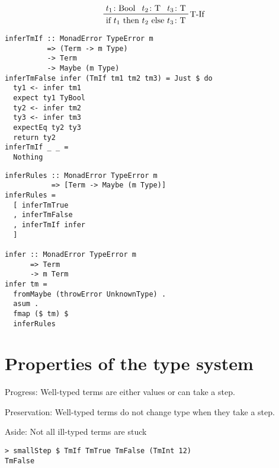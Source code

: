 \documentclass{beamer}
\begin{document}
\begin{frame}[fragile]
  \begin{displaymath}
    \prftree[r]{T-If}
    {t_1 \colon \text{Bool}}
    {t_2 \colon \text{T}}
    {t_3 \colon \text{T}}
    {\text{if $t_1$ then $t_2$ else $t_3$} \colon \text{T}}
  \end{displaymath}
  \begin{verbatim}
inferTmIf :: MonadError TypeError m 
          => (Term -> m Type)
          -> Term 
          -> Maybe (m Type)
inferTmFalse infer (TmIf tm1 tm2 tm3) = Just $ do
  ty1 <- infer tm1
  expect ty1 TyBool
  ty2 <- infer tm2
  ty3 <- infer tm3
  expectEq ty2 ty3
  return ty2
inferTmIf _ _ =
  Nothing
  \end{verbatim}
\end{frame}

\begin{frame}[fragile]
  \begin{verbatim}
inferRules :: MonadError TypeError m 
           => [Term -> Maybe (m Type)]
inferRules =
  [ inferTmTrue
  , inferTmFalse
  , inferTmIf infer
  ]

infer :: MonadError TypeError m 
      => Term 
      -> m Term
infer tm =
  fromMaybe (throwError UnknownType) .
  asum .
  fmap ($ tm) $
  inferRules
  \end{verbatim}
\end{frame}

\section{Properties of the type system}

\begin{frame}[c]
  \begin{center}
    Progress: Well-typed terms are either values or can take a step.
  \end{center}
\end{frame}

\begin{frame}[c]
  \begin{center}
    Preservation: Well-typed terms do not change type when they take a step.
  \end{center}
\end{frame}

\begin{frame}[fragile,c]
  \begin{center}
    Aside: Not all ill-typed terms are stuck
  \end{center}
  \begin{verbatim}
> smallStep $ TmIf TmTrue TmFalse (TmInt 12)
TmFalse
  \end{verbatim}
\end{frame}
\end{document}
